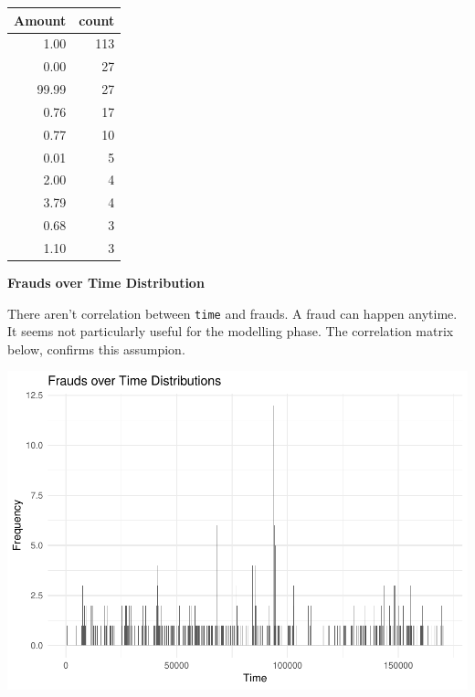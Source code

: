 \documentclass[]{article}
\begin{document}
\begin{table}[H]
\centering\begingroup\fontsize{10}{12}\selectfont

\begin{tabular}{r|r}
\hline
Amount & count\\
\hline
1.00 & 113\\
\hline
0.00 & 27\\
\hline
99.99 & 27\\
\hline
0.76 & 17\\
\hline
0.77 & 10\\
\hline
0.01 & 5\\
\hline
2.00 & 4\\
\hline
3.79 & 4\\
\hline
0.68 & 3\\
\hline
1.10 & 3\\
\hline
\end{tabular}
\endgroup{}
\end{table}
\newpage

\textbf{Frauds over Time Distribution}

There aren't correlation between \texttt{time} and frauds. A fraud can
happen anytime. It seems not particularly useful for the modelling
phase. The correlation matrix below, confirms this assumpion.

\begin{center}\includegraphics{Credit_Card_Fraud_Detection_Project_Report_files/figure-latex/unnamed-chunk-12-1} \end{center}
\end{document}
